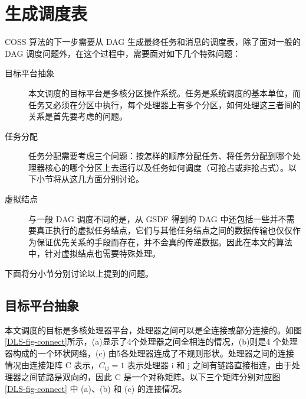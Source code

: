 ﻿%

\chapter{生成调度表}
\label{DLS-chapter-SSL}


COSS 算法的下一步需要从 DAG 生成最终任务和消息的调度表，除了面对一般的 DAG 调度问题外，在这个过程中，需要面对如下几个特殊问题：
\begin{description}
  \item[目标平台抽象] 本文调度的目标平台是多核分区操作系统。任务是系统调度的基本单位，而任务又必须在分区中执行，每个处理器上有多个分区，如何处理这三者间的关系是首先要考虑的问题。
  \item[任务分配] %
      任务分配需要考虑三个问题：按怎样的顺序分配任务、将任务分配到哪个处理器核心的哪个分区上去运行以及任务如何调度（可抢占或非抢占式）。以下小节将从这几方面分别讨论。
  \item[虚拟结点] 与一般 DAG 调度不同的是，从 GSDF 得到的 DAG 中还包括一些并不需要真正执行的虚拟任务结点，它们与其他任务结点之间的数据传输也仅仅作为保证优先关系的手段而存在，并不会真的传递数据。因此在本文的算法中，针对虚拟结点也需要特殊处理。
\end{description}

下面将分小节分别讨论以上提到的问题。

\section{目标平台抽象}

本文调度的目标是多核处理器平台，处理器之间可以是全连接或部分连接的。如图 \ref{DLS-fig-connect}所示，(a)显示了4个处理器之间全相连的情况，(b)则是4 个处理器构成的一个环状网络，(c) 由5各处理器连成了不规则形状。处理器之间的连接情况由连接矩阵 C 表示，$C_{ij}=1$ 表示处理器 i 和 j 之间有链路直接相连，由于处理器之间链路是双向的，因此 C 是一个对称矩阵。以下三个矩阵分别对应图 \ref{DLS-fig-connect} 中 (a)、(b) 和 (c) 的连接情况。

